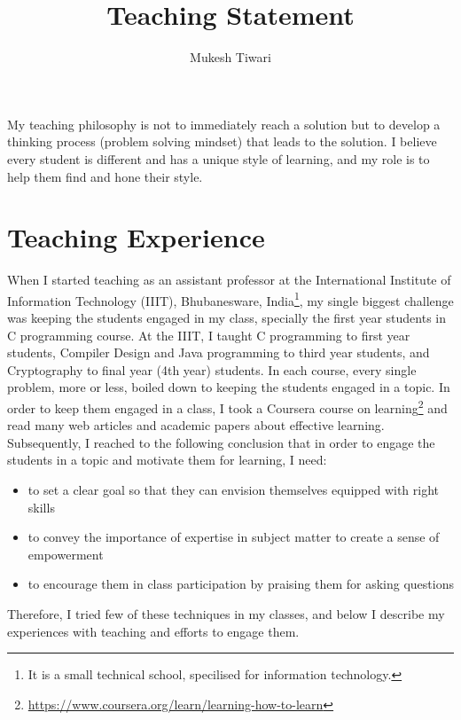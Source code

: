 \documentclass[a4paper]{article}
\title{Teaching Statement}
\author{Mukesh Tiwari}
\begin{document}
\fontsize{12}{15}
\selectfont
\maketitle


My teaching philosophy is not to immediately reach a solution but to develop a 
thinking process (problem solving mindset) that leads to the solution. I believe every 
student is different and has a unique style of learning, and my role is to help them find 
and hone their style.

\section{Teaching Experience}
When I started teaching as an assistant professor at the International Institute of Information 
Technology (IIIT), Bhubanesware, India\footnote{It is a small technical school, 
specilised for information technology.},
my single biggest challenge was keeping the students engaged in my class, specially the first year 
students in C programming course. At the IIIT, I taught C programming to 
first year students, Compiler Design and Java programming to third year students, and
Cryptography to final year (4th year) students. In each course, every single 
problem,  more or less, boiled down to keeping the students engaged in a topic. 
In order to keep them engaged in a class, I took a Coursera course on 
learning\footnote{\url{https://www.coursera.org/learn/learning-how-to-learn}} and 
read many web articles and academic papers about effective learning.
Subsequently, I reached to the following conclusion that 
in order to engage the students in a topic and motivate them for learning, I need:
\begin{itemize}
  \item to set a clear goal so that they can envision themselves equipped with right skills
  \item to convey the importance of expertise in subject matter to create a sense of empowerment
  \item to encourage them in class participation by praising them for asking questions
\end{itemize} 
Therefore, I tried few of these techniques in my classes, and below I 
describe my experiences with teaching and efforts to engage them. 
\end{document}
